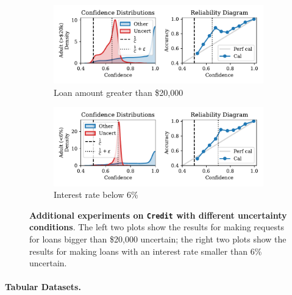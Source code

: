 \begin{figure}[t]
\centering

\begin{subfigure}[b]{0.495\textwidth}
  \centering
  \includegraphics[width=\linewidth]{figs/confidential_guardian/credit_res_loanamt.pdf}
  \caption{Loan amount greater than \$20,000}
\end{subfigure}
\hfill
\begin{subfigure}[b]{0.495\textwidth}
  \centering
  \includegraphics[width=\linewidth]{figs/confidential_guardian/credit_res_intrate.pdf}
  \caption{Interest rate below 6\%}
\end{subfigure}

\caption[\textbf{Additional experiments on \texttt{Credit} with different uncertainty conditions.}]{\textbf{Additional experiments on \texttt{Credit} with different uncertainty conditions}. The left two plots show the results for making requests for loans bigger than \$20,000 uncertain; the right two plots show the results for making loans with an interest rate smaller than 6\% uncertain.}
\label{fig:credit_ext}
\end{figure}


\paragraph{Tabular Datasets.}


